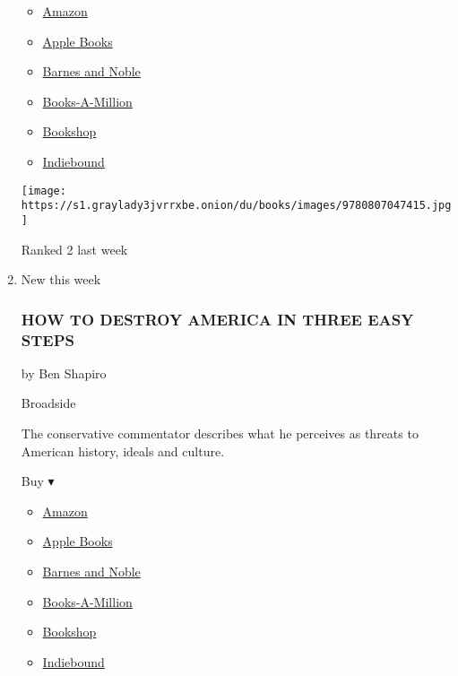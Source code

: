 \begin{enumerate}
  \begin{itemize}
  \tightlist
  \item
    \href{https://www.amazon.com/White-Fragility-People-About-Racism/dp/0807047414?tag=NYTBS-20}{Amazon}
  \item
    \href{https://du-gae-books-dot-nyt-du-prd.appspot.com/buy?title=WHITE+FRAGILITY\&author=Robin+DiAngelo}{Apple
    Books}
  \item
    \href{https://www.anrdoezrs.net/click-7990613-11819508?url=https\%3A\%2F\%2Fwww.barnesandnoble.com\%2Fw\%2F\%3Fean\%3D9780807047415}{Barnes
    and Noble}
  \item
    \href{https://www.anrdoezrs.net/click-7990613-35140?url=https\%3A\%2F\%2Fwww.booksamillion.com\%2Fp\%2FWHITE\%2BFRAGILITY\%2FRobin\%2BDiAngelo\%2F9780807047415}{Books-A-Million}
  \item
    \href{https://bookshop.org/a/3546/9780807047415}{Bookshop}
  \item
    \href{https://www.indiebound.org/book/9780807047415?aff=NYT}{Indiebound}
  \end{itemize}

  \texttt{[image: https://s1.graylady3jvrrxbe.onion/du/books/images/9780807047415.jpg]}

  Ranked 2 last week
\item
  New this week

  \hypertarget{how-to-destroy-america-in-three-easy-steps}{%
  \subsubsection{HOW TO DESTROY AMERICA IN THREE EASY
  STEPS}\label{how-to-destroy-america-in-three-easy-steps}}

  by Ben Shapiro

  Broadside

  The conservative commentator describes what he perceives as threats to
  American history, ideals and culture.

  Buy ▾

  \begin{itemize}
  \tightlist
  \item
    \href{https://www.amazon.com/dp/006300187X?tag=NYTBSREV-20\&tag=NYTBS-20}{Amazon}
  \item
    \href{https://du-gae-books-dot-nyt-du-prd.appspot.com/buy?title=HOW+TO+DESTROY+AMERICA+IN+THREE+EASY+STEPS\&author=Ben+Shapiro}{Apple
    Books}
  \item
    \href{https://www.anrdoezrs.net/click-7990613-11819508?url=https\%3A\%2F\%2Fwww.barnesandnoble.com\%2Fw\%2F\%3Fean\%3D9780063001879}{Barnes
    and Noble}
  \item
    \href{https://www.anrdoezrs.net/click-7990613-35140?url=https\%3A\%2F\%2Fwww.booksamillion.com\%2Fp\%2FHOW\%2BTO\%2BDESTROY\%2BAMERICA\%2BIN\%2BTHREE\%2BEASY\%2BSTEPS\%2FBen\%2BShapiro\%2F9780063001879}{Books-A-Million}
  \item
    \href{https://bookshop.org/a/3546/9780063001879}{Bookshop}
  \item
    \href{https://www.indiebound.org/book/9780063001879?aff=NYT}{Indiebound}
  \end{itemize}


\end{enumerate}
